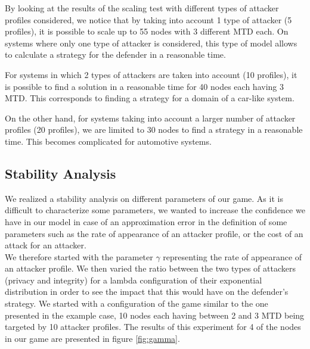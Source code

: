 By looking at the results of the scaling test with different types of attacker profiles considered, we notice that by taking into account 1 type of attacker (5 profiles), it is possible to scale up to 55 nodes with 3 different MTD each. On systems where only one type of attacker is considered, this type of model allows to calculate a strategy for the defender in a reasonable time.

For systems in which 2 types of attackers are taken into account (10 profiles), it is possible to find a solution in a reasonable time for 40 nodes each having 3 MTD. This corresponds to finding a strategy for a domain of a car-like system. 

On the other hand, for systems taking into account a larger number of attacker profiles (20 profiles), we are limited to 30 nodes to find a strategy in a reasonable time. This becomes complicated for automotive systems.

\subsection{Stability Analysis}

We realized a stability analysis on different parameters of our game. As it is difficult to characterize some parameters, we wanted to increase the confidence we have in our model in case of an approximation error in the definition of some parameters such as the rate of appearance of an attacker profile, or the cost of an attack for an attacker. \\

We therefore started with the parameter $\gamma$ representing the rate of appearance of an attacker profile. We then varied the ratio between the two types of attackers (privacy and integrity) for a lambda configuration of their exponential distribution in order to see the impact that this would have on the defender's strategy. We started with a configuration of the game similar to the one presented in the example case, 10 nodes each having between 2 and 3 MTD being targeted by 10 attacker profiles.
The results of this experiment for 4 of the nodes in our game are presented in figure \ref{fig:gamma}. \\

